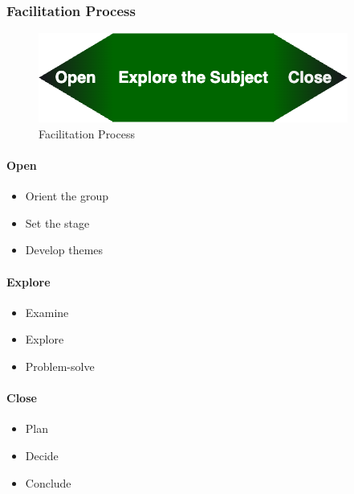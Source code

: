 \documentclass[
]{book}
\providecommand{\tightlist}{%
  \setlength{\itemsep}{0pt}\setlength{\parskip}{0pt}}
\begin{document}
\hypertarget{facilitation-process}{%
\subsubsection*{Facilitation Process}\label{facilitation-process}}

\begin{figure}
\centering
\includegraphics{assets/presentations/facilitation/fac-process.drawio.png}
\caption{Facilitation Process}
\end{figure}

\hypertarget{open}{%
\paragraph*{Open}\label{open}}

\begin{itemize}
\tightlist
\item
  Orient the group
\item
  Set the stage
\item
  Develop themes
\end{itemize}

\hypertarget{explore}{%
\paragraph*{Explore}\label{explore}}

\begin{itemize}
\tightlist
\item
  Examine
\item
  Explore
\item
  Problem-solve
\end{itemize}

\hypertarget{close}{%
\paragraph*{Close}\label{close}}

\begin{itemize}
\tightlist
\item
  Plan
\item
  Decide
\item
  Conclude
\end{itemize}
\end{document}
